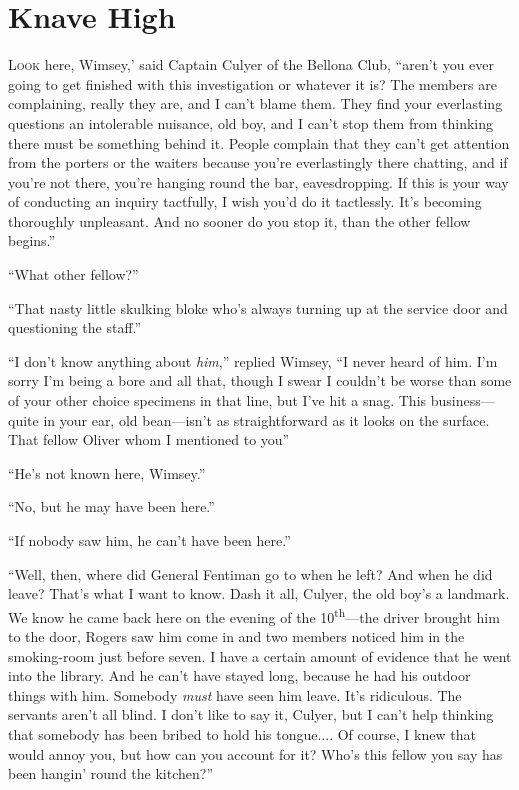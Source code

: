 \chapter{Knave High}

\lettrine[lines=4,ante=‘]{L}{ook} here, Wimsey,' said Captain Culyer of the Bellona Club, \enquote{aren't you ever going to get finished with this investigation or whatever it is? The members are complaining, really they are, and I can't blame them. They find your everlasting questions an intolerable nuisance, old boy, and I can't stop them from thinking there must be something behind it. People complain that they can't get attention from the porters or the waiters because you're everlastingly there chatting, and if you're not there, you're hanging round the bar, eavesdropping. If this is your way of conducting an inquiry tactfully, I wish you'd do it tactlessly. It's becoming thoroughly unpleasant. And no sooner do you stop it, than the other fellow begins.}

\enquote{What other fellow?}

\enquote{That nasty little skulking bloke who's always turning up at the service door and questioning the staff.}

\enquote{I don't know anything about \textit{him},} replied Wimsey, \enquote{I never heard of him. I'm sorry I'm being a bore and all that, though I swear I couldn't be worse than some of your other choice specimens in that line, but I've hit a snag. This business\allowbreak---\allowbreak quite in your ear, old bean\allowbreak---\allowbreak isn't as straightforward as it looks on the surface. That fellow Oliver whom I mentioned to you\longdash}

\enquote{He's not known here, Wimsey.}

\enquote{No, but he may have been here.}

\enquote{If nobody saw him, he can't have been here.}

\enquote{Well, then, where did General Fentiman go to when he left? And when he did leave? That's what I want to know. Dash it all, Culyer, the old boy's a landmark. We know he came back here on the evening of the  10\textsuperscript{th}---the driver brought him to the door, Rogers saw him come in and two members noticed him in the smoking-room just before seven. I have a certain amount of evidence that he went into the library. And he can't have stayed long, because he had his outdoor things with him. Somebody \textit{must} have seen him leave. It's ridiculous. The servants aren't all blind. I don't like to say it, Culyer, but I can't help thinking that somebody has been bribed to hold his tongue.... Of course, I knew that would annoy you, but how can you account for it? Who's this fellow you say has been hangin' round the kitchen?}

